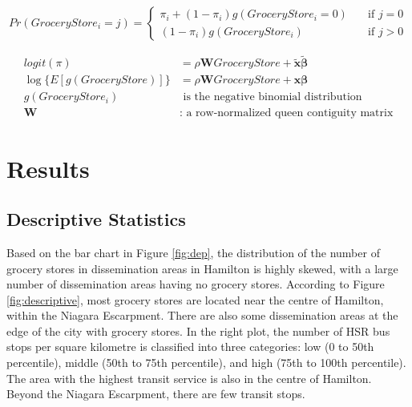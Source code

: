 \documentclass[preprint, 3p,
authoryear]{elsarticle} %
\begin{document}
\begin{equation}
\label{eq:1}
Pr(GroceryStore_i=j) = \begin{cases}
       \pi_i + (1-\pi_i)g(GroceryStore_i=0) &\quad\text{if } j=0\\
       (1-\pi_i)g(GroceryStore_i) &\quad\text{if } j>0
     \end{cases}
\end{equation}

\begin{equation}
\label{eq:2}
\begin{aligned}
logit(\pi) &= \rho \mathbf{W} GroceryStore + \tilde{\mathbf{x}} \tilde{\boldsymbol{\beta}} \\
\log\{E[g(GroceryStore)]\} &= \rho \mathbf{W} GroceryStore + \mathbf{x} \boldsymbol{\beta} \\
g(GroceryStore_i) &\text{ is the negative binomial distribution} \\
\mathbf{W} &\text{: a row-normalized queen contiguity matrix}
\end{aligned}
\end{equation}

\section{Results}\label{results}

\subsection{Descriptive Statistics}\label{descriptive-statistics}

Based on the bar chart in Figure \ref{fig:dep}, the distribution of the
number of grocery stores in dissemination areas in Hamilton is highly
skewed, with a large number of dissemination areas having no grocery
stores. According to Figure \ref{fig:descriptive}, most grocery stores
are located near the centre of Hamilton, within the Niagara Escarpment.
There are also some dissemination areas at the edge of the city with
grocery stores. In the right plot, the number of HSR bus stops per
square kilometre is classified into three categories: low (0 to 50th
percentile), middle (50th to 75th percentile), and high (75th to 100th
percentile). The area with the highest transit service is also in the
centre of Hamilton. Beyond the Niagara Escarpment, there are few transit
stops.
\end{document}
